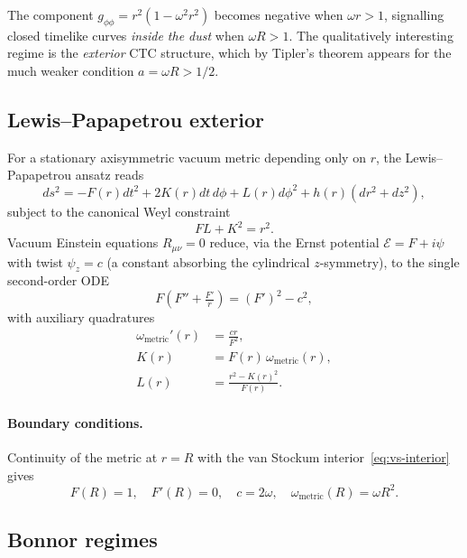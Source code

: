\documentclass[11pt,a4paper]{article}
\begin{document}
The component $g_{\phi\phi} = r^2 (1 - \omega^2 r^2)$ becomes negative
when $\omega r > 1$, signalling closed timelike curves \emph{inside the
dust} when $\omega R > 1$. The qualitatively interesting regime is the
\emph{exterior} CTC structure, which by Tipler's theorem appears for
the much weaker condition $a = \omega R > 1/2$.

\subsection{Lewis--Papapetrou exterior}

For a stationary axisymmetric vacuum metric depending only on $r$,
the Lewis--Papapetrou ansatz reads
\begin{equation}
\label{eq:lp}
ds^2 = -F(r) dt^2 + 2 K(r) dt\, d\phi + L(r) d\phi^2 + h(r)(dr^2 + dz^2),
\end{equation}
subject to the canonical Weyl constraint
\begin{equation}
\label{eq:constraint}
F L + K^2 = r^2.
\end{equation}
Vacuum Einstein equations $R_{\mu\nu} = 0$ reduce, via the Ernst
potential $\mathcal{E} = F + i\psi$ with twist
$\psi_z = c$ (a constant absorbing the cylindrical $z$-symmetry), to the
single second-order ODE
\begin{equation}
\label{eq:ernst}
F\!\left(F'' + \tfrac{F'}{r}\right) = (F')^2 - c^2,
\end{equation}
with auxiliary quadratures
\begin{align}
\omega_{\text{metric}}'(r) &= \frac{c r}{F^2}, \\
K(r) &= F(r) \, \omega_{\text{metric}}(r), \\
L(r) &= \frac{r^2 - K(r)^2}{F(r)}.
\end{align}

\paragraph{Boundary conditions.} Continuity of the metric at $r = R$
with the van Stockum interior~\eqref{eq:vs-interior} gives
\begin{equation}
\label{eq:bc}
F(R) = 1, \quad F'(R) = 0, \quad c = 2\omega, \quad
\omega_{\text{metric}}(R) = \omega R^2.
\end{equation}

\subsection{Bonnor regimes}
\end{document}
